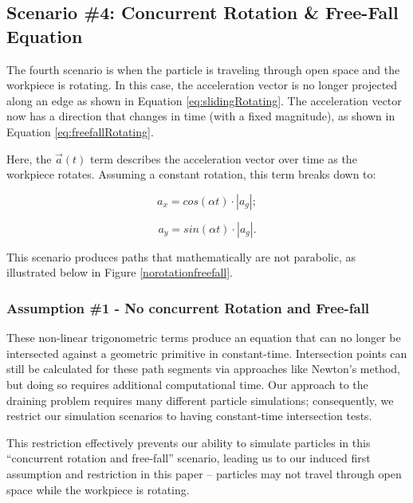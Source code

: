 		\subsection{Scenario \#4: Concurrent Rotation \& Free-Fall Equation}

The fourth scenario is when the particle is traveling through open space and the workpiece is rotating. In this case, the acceleration vector is no longer projected along an edge as shown in Equation \eqref{eq:slidingRotating}. The acceleration vector now has a direction that changes in time (with a fixed magnitude), as shown in Equation \eqref{eq:freefallRotating}.

 {
	\label{eq:freefallRotating}
}

Here, the $\vec{a}(t)$ term describes the acceleration vector over time as the workpiece rotates. Assuming a constant rotation, this term breaks down to:

$$
a_x = cos(\alpha t) \cdot |a_g|;
$$

$$
a_y = sin(\alpha t) \cdot |a_g|.
$$

This scenario produces paths that mathematically are not parabolic, as illustrated below in Figure \ref{norotationfreefall}.


		\subsubsection{Assumption \#1 - No concurrent Rotation and Free-fall}

These non-linear trigonometric terms produce an equation that can no longer be intersected against a geometric primitive in constant-time. Intersection points can still be calculated for these path segments via approaches like Newton's method, but doing so requires additional computational time. Our approach to the draining problem requires many different particle simulations; consequently, we restrict our simulation scenarios to having constant-time intersection tests.

This restriction effectively prevents our ability to simulate particles in this ``concurrent rotation and free-fall'' scenario, leading us to our induced first assumption and restriction in this paper -- particles may not travel through open space while the workpiece is rotating.

